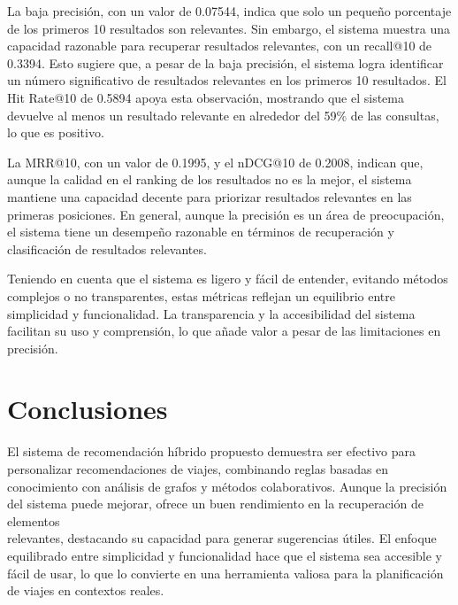 \documentclass[runningheads]{llncs}
\begin{document}
La baja precisión, con un valor de 0.07544, indica que solo un pequeño porcentaje de los primeros 10 resultados son relevantes. Sin embargo, el sistema muestra una capacidad razonable para recuperar resultados relevantes, con un recall@10 de 0.3394. Esto sugiere que, a pesar de la baja precisión, el sistema logra identificar un número significativo de resultados relevantes en los primeros 10 resultados. El Hit Rate@10 de 0.5894 apoya esta observación, mostrando que el sistema devuelve al menos un resultado relevante en alrededor del 59\% de las consultas, lo que es positivo.

La MRR@10, con un valor de 0.1995, y el nDCG@10 de 0.2008, indican que, aunque la calidad en el ranking de los resultados no es la mejor, el sistema mantiene una capacidad decente para priorizar resultados relevantes en las primeras posiciones. En general, aunque la precisión es un área de preocupación, el sistema tiene un desempeño razonable en términos de recuperación y clasificación de resultados relevantes.

Teniendo en cuenta que el sistema es ligero y fácil de entender, evitando métodos complejos o no transparentes, estas métricas reflejan un equilibrio entre simplicidad y funcionalidad. La transparencia y la accesibilidad del sistema facilitan su uso y comprensión, lo que añade valor a pesar de las limitaciones en precisión.

\section{Conclusiones}
El sistema de recomendación híbrido propuesto demuestra ser efectivo para personalizar recomendaciones de viajes, combinando reglas basadas en conocimiento con análisis de grafos y métodos colaborativos. Aunque la precisión del sistema puede mejorar, ofrece un buen rendimiento en la recuperación de elementos \\ relevantes, destacando su capacidad para generar sugerencias útiles. El enfoque equilibrado entre simplicidad y funcionalidad hace que el sistema sea accesible y fácil de usar, lo que lo convierte en una herramienta valiosa para la planificación de viajes en contextos reales.
\end{document}
